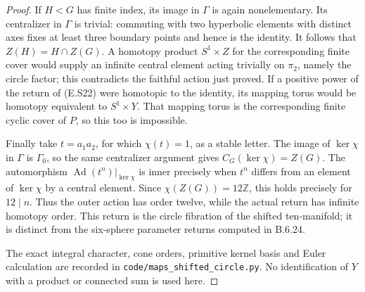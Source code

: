 \begin{proof}
If $H<G$ has finite index, its image in $\Gamma$ is again
nonelementary. Its centralizer in $\Gamma$ is trivial:
commuting with two hyperbolic elements with distinct axes
fixes at least three boundary points and hence is the
identity. It follows that
$Z(H)=H\cap Z(G)$. A homotopy product $S^1\times Z$ for
the corresponding finite cover would supply an infinite
central element acting trivially on $\pi_2$, namely the
circle factor; this contradicts the faithful action just
proved. If a positive power of the return of (E.S22) were
homotopic to the identity, its mapping torus would be
homotopy equivalent to $S^1\times Y$. That mapping torus
is the corresponding finite cyclic cover of $P$, so this
too is impossible.

Finally take $t=a_1a_2$, for which $\chi(t)=1$, as a
stable letter. The image of $\ker\chi$ in $\Gamma$ is
$\Gamma_0$, so the same centralizer argument gives
$C_G(\ker\chi)=Z(G)$. The automorphism
$\operatorname{Ad}(t^n)|_{\ker\chi}$ is inner precisely
when $t^n$ differs from an element of $\ker\chi$ by a
central element. Since $\chi(Z(G))=12\mathbb Z$, this
holds precisely for $12\mid n$. Thus the outer action has
order twelve, while the actual return has infinite homotopy
order. This return is the circle fibration of the shifted
ten-manifold; it is distinct from the six-sphere parameter
returns computed in B.6.24.

The exact integral character, cone orders, primitive kernel
basis and Euler calculation are recorded in
\texttt{code/maps\_shifted\_circle.py}. No identification
of $Y$ with a product or connected sum is used here.
\end{proof}

